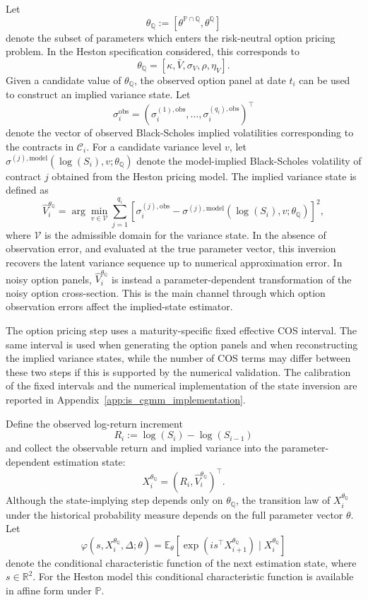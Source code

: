 \documentclass[11pt,a4paper,notitlepage]{article}
\numberwithin{equation}{section}
\begin{document}
Let
\[
\theta_{\mathbb Q}
:=
\left[
\theta^{\mathbb{P}\cap\mathbb{Q}},
\theta^\mathbb{Q}
\right]
\]
denote the subset of parameters which enters the risk-neutral option pricing problem. In the Heston specification considered, this corresponds to
\[
\theta_{\mathbb Q}
=
\left[
\kappa,\bar V,\sigma_V,\rho,\eta_V
\right].
\]
Given a candidate value of \(\theta_{\mathbb Q}\), the observed option panel at date \(t_i\) can be used to construct an implied variance state. Let
\[
\sigma_i^{\mathrm{obs}}
=
\left(
\sigma_i^{(1),\mathrm{obs}},
\dots,
\sigma_i^{(q_i),\mathrm{obs}}
\right)^\top
\]
denote the vector of observed Black-Scholes implied volatilities corresponding to the contracts in \(\mathcal C_i\). For a candidate variance level \(v\), let
\(
\sigma^{(j),\mathrm{model}}
\left(
\log(S_i),v;\theta_{\mathbb Q}
\right)
\)
denote the model-implied Black-Scholes volatility of contract \(j\) obtained from the Heston pricing model. The implied variance state is defined as
\begin{equation}
\widehat V_i^{\theta_{\mathbb Q}}
=
\arg\min_{v\in\mathcal V}
\sum_{j=1}^{q_i}
\left[
\sigma_i^{(j),\mathrm{obs}}
-
\sigma^{(j),\mathrm{model}}
\left(
\log(S_i),v;\theta_{\mathbb Q}
\right)
\right]^2 ,
\label{eq:is_implied_state}
\end{equation}
where \(\mathcal V\) is the admissible domain for the variance state. In the absence of observation error, and evaluated at the true parameter vector, this inversion recovers the latent variance sequence up to numerical approximation error. In noisy option panels, \(\widehat V_i^{\theta_{\mathbb Q}}\) is instead a parameter-dependent transformation of the noisy option cross-section. This is the main channel through which option observation errors affect the implied-state estimator.

The option pricing step uses a maturity-specific fixed effective COS interval. The same interval is used when generating the option panels and when reconstructing the implied variance states, while the number of COS terms may differ between these two steps if this is supported by the numerical validation. The calibration of the fixed intervals and the numerical implementation of the state inversion are reported in Appendix~\ref{app:is_cgmm_implementation}.

Define the observed log-return increment
\[
R_i
:=
\log(S_i)-\log(S_{i-1})
\]
and collect the observable return and implied variance into the parameter-dependent estimation state:
\[
X_i^{\theta_{\mathbb Q}}
=
\left(
R_i,
\widehat V_i^{\theta_{\mathbb Q}}
\right)^\top .
\label{eq:is_state_vector}
\]
Although the state-implying step depends only on \(\theta_{\mathbb Q}\), the transition law of \(X_i^{\theta_{\mathbb Q}}\) under the historical probability measure depends on the full parameter vector \(\theta\). Let
\[
\varphi\left(s,X_i^{\theta_{\mathbb Q}},\Delta;\theta\right)
=
\mathbb E_\theta
\left[
\exp\left(
is^\top X_{i+1}^{\theta_{\mathbb Q}}
\right)
\mid X_i^{\theta_{\mathbb Q}}
\right]
\]
denote the conditional characteristic function of the next estimation state, where \(s\in\mathbb R^2\). For the Heston model this conditional characteristic function is available in affine form under \(\mathbb P\).
\end{document}
